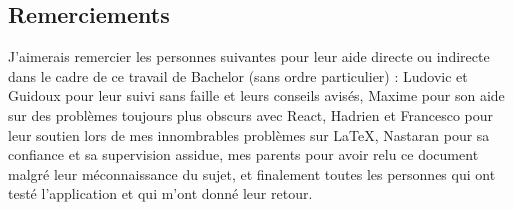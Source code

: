 \subsection{Remerciements}

J'aimerais remercier les personnes suivantes pour leur aide directe ou indirecte dans le cadre de ce travail de Bachelor (sans ordre particulier) : Ludovic et Guidoux pour leur suivi sans faille et leurs conseils avisés, Maxime pour son aide sur des problèmes toujours plus obscurs avec React, Hadrien et Francesco pour leur soutien lors de mes innombrables problèmes sur LaTeX, Nastaran pour sa confiance et sa supervision assidue, mes parents pour avoir relu ce document malgré leur méconnaissance du sujet, et finalement toutes les personnes qui ont testé l'application et qui m'ont donné leur retour.
